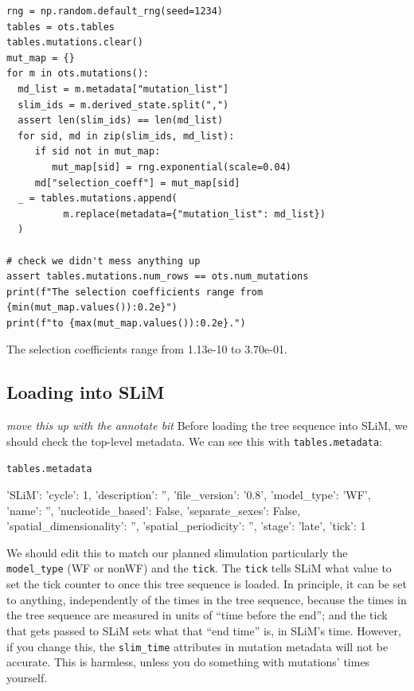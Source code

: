 \documentclass[12pt]{article}
\newcommand{\comment}[1]{\textit{\color{green} #1}}
\begin{document}
\begin{listing}[H]
    \begin{verbatim}
rng = np.random.default_rng(seed=1234)
tables = ots.tables
tables.mutations.clear()
mut_map = {}
for m in ots.mutations():
  md_list = m.metadata["mutation_list"]
  slim_ids = m.derived_state.split(",")
  assert len(slim_ids) == len(md_list)
  for sid, md in zip(slim_ids, md_list):
     if sid not in mut_map:
        mut_map[sid] = rng.exponential(scale=0.04)
     md["selection_coeff"] = mut_map[sid]
  _ = tables.mutations.append(
          m.replace(metadata={"mutation_list": md_list})
  )

# check we didn't mess anything up
assert tables.mutations.num_rows == ots.num_mutations
print(f"The selection coefficients range from {min(mut_map.values()):0.2e}")
print(f"to {max(mut_map.values()):0.2e}.")
  \end{verbatim}
\end{listing}
\begin{pycon}
The selection coefficients range from 1.13e-10 to 3.70e-01.
\end{pycon}

\subsection*{Loading into SLiM}
\comment{move this up with the annotate bit}
Before loading the tree sequence into SLiM,
we should check the top-level metadata.
We can see this with \verb|tables.metadata|:

\begin{listing}[H]
    \begin{verbatim}
tables.metadata
    \end{verbatim}
\end{listing}
\begin{pycon}
{
    'SLiM': {
        'cycle': 1, 
        'description': '', 
        'file_version': '0.8', 
        'model_type': 'WF', 
        'name': '', 
        'nucleotide_based': False, 
        'separate_sexes': False, 
        'spatial_dimensionality': '', 
        'spatial_periodicity': '', 
        'stage': 'late', 
        'tick': 1
        }
}
\end{pycon}

We should edit this to match our planned slimulation particularly the \verb|model_type| (WF or nonWF) and the \verb|tick|.
The \verb|tick| tells SLiM what value to set the tick counter to once this tree sequence is loaded.
In principle, it can be set to anything, independently of the times in the tree sequence,
because the times in the tree sequence are measured in units of “time before the end”;
and the tick that gets passed to SLiM sets what that “end time” is, in SLiM’s time.
However, if you change this, the \verb|slim_time| attributes in mutation metadata will not be accurate.
This is harmless, unless you do something with mutations’ times yourself.
\end{document}
